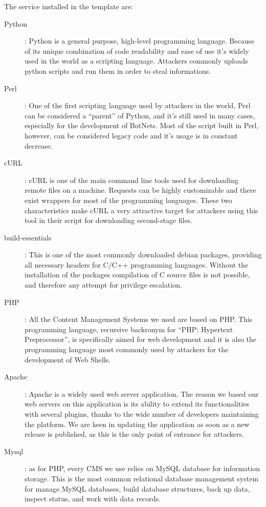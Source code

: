 The service installed in the template are:
\begin{description}
\item[Python]: Python\cite{python} is a general purpose, high-level programming language. Because of its unique combination of code readability and ease of use it's widely used in the world as a scripting language. Attackers commonly uploads python scripts and run them in order to steal informations.
\item[Perl]: One of the first scripting language used by attackers in the world, Perl\cite{perl} can be considered a ``parent'' of Python, and it's still used in many cases, especially for the development of BotNets. Most of the script built in Perl, however, can be considered legacy code and it's usage is in constant decrease.
\item [cURL]: cURL\cite{curl} is one of the main command line tools used for downloading remote files on a machine. Requests can be highly customizable and there exist wrappers for most of the programming languages. These two characteristics make cURL a very attractive target for attackers using this tool in their script for downloading second-stage files.
\item [build-essentials]: This is one of the most commonly downloaded debian packages, providing all necessary headers for C/C++ programming languages. Without the installation of the packages compilation of C source files is not possible, and therefore any attempt for privilege escalation.
\item[PHP]: All the Content Management Systems we used are based on PHP. This programming language\cite{php}, recursive backronym for ``PHP: Hypertext Preprocessor'', is specifically aimed for web development and it is also the programming language most commonly used by attackers for the development of Web Shells.
\item[Apache]: Apache\cite{apache} is a widely used web server application. The reason we based our web servers on this application is its ability to extend its functionalities with several plugins, thanks to the wide number of developers maintaining the platform. We are keen in updating the application as soon as a new release is published, as this is the only point of entrance for attackers.
\item[Mysql]: as for PHP, every CMS we use relies on MySQL\cite{mysql} database for information storage. This is the most common relational database management system for manage MySQL databases, build database structures, back up data, inspect status, and work with data records.
\end{description}


